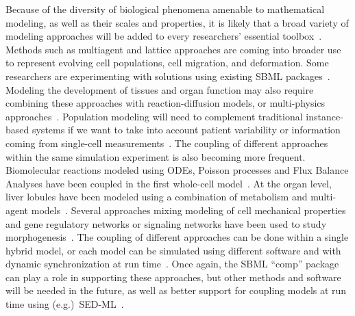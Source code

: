 \documentclass{sbml-paper}
\begin{document}
Because of the diversity of biological phenomena amenable to mathematical modeling, as well as their scales and properties, it is likely that a broad variety of modeling approaches will be added to every researchers' essential toolbox~\citep{Cvijovic2014bridging}.  Methods such as multiagent and lattice approaches are coming into broader use to represent evolving cell populations, cell migration, and deformation.  Some researchers are experimenting with solutions using existing SBML packages~\citep{watanabe2016efficient, varela2018epilog}.  Modeling the development of tissues and organ function may also require combining these approaches with reaction-diffusion models, or multi-physics approaches~\citep{Nickerson2016human}.  Population modeling will need to complement traditional instance-based systems if we want to take into account patient variability or information coming from single-cell measurements~\citep{Levin1997mathematical}.  The coupling of different approaches within the same simulation experiment is also becoming more frequent.  Biomolecular reactions modeled using ODEs, Poisson processes and Flux Balance Analyses have been coupled in the first whole-cell model~\citep{Karr2015principles}.  At the organ level, liver lobules have been modeled using a combination of metabolism and multi-agent models~\citep{schliess2014integrated}.  Several approaches mixing modeling of cell mechanical properties and gene regulatory networks or signaling networks have been used to study morphogenesis~\citep[e.g.,][]{tanaka2015lbibcell}.  The coupling of different approaches can be done within a single hybrid model, or each model can be simulated using different software and with dynamic synchronization at run time~\citep{mattioni2013integration}.  Once again, the SBML ``comp'' package can play a role in supporting these approaches, but other methods and software will be needed in the future, as well as better support for coupling models at run time using (e.g.)\ SED-ML~\citep{waltemath2011reproducible}.
\end{document}
